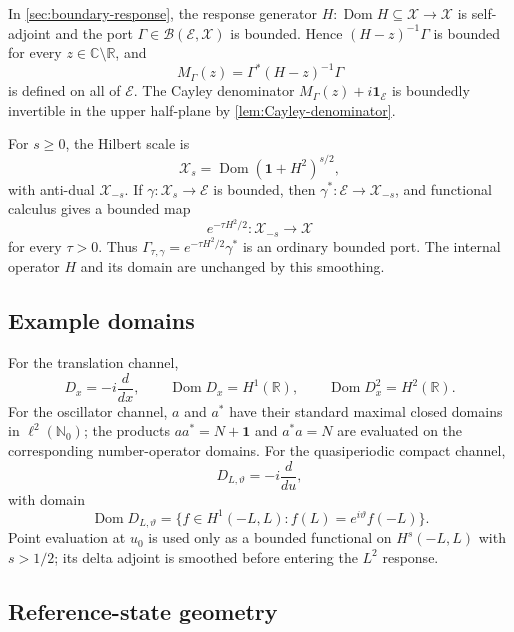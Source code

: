 \documentclass[11pt,reqno]{scrartcl}
\newcommand{\CC}{\mathbb C}
\newcommand{\RR}{\mathbb R}
\newcommand{\NN}{\mathbb N}
\DeclareMathOperator{\Dom}{Dom}
\newcommand{\scrX}{\mathscr X}
\newcommand{\scrE}{\mathscr E}
\theoremstyle{plain}
\theoremstyle{definition}
\theoremstyle{remark}
\begin{document}
In \cref{sec:boundary-response}, the response generator
\(H:\Dom H\subseteq\scrX\to\scrX\) is self-adjoint and the port
\(\Gamma\in\mathcal B(\scrE,\scrX)\) is bounded.  Hence
\((H-z)^{-1}\Gamma\) is bounded for every \(z\in\CC\setminus\RR\), and
\begin{equation}
  M_\Gamma(z)=\Gamma^*(H-z)^{-1}\Gamma
\end{equation}
is defined on all of \(\scrE\).  The Cayley denominator
\(M_\Gamma(z)+i\mathbf1_{\scrE}\) is boundedly invertible in the upper
half-plane by \cref{lem:Cayley-denominator}.

For \(s\ge0\), the Hilbert scale is
\begin{equation}
  \scrX_s=\Dom(\mathbf1+H^2)^{s/2},
\end{equation}
with anti-dual \(\scrX_{-s}\).  If
\(\gamma:\scrX_s\to\scrE\) is bounded, then
\(\gamma^*:\scrE\to\scrX_{-s}\), and functional calculus gives a bounded map
\begin{equation}
  e^{-\tau H^2/2}:\scrX_{-s}\longrightarrow\scrX
\end{equation}
for every \(\tau>0\).  Thus
\(\Gamma_{\tau,\gamma}=e^{-\tau H^2/2}\gamma^*\) is an ordinary bounded
port.  The internal operator \(H\) and its domain are unchanged by this
smoothing.

\subsection{Example domains}

For the translation channel,
\begin{equation}
  D_x=-i\frac{d}{dx},
  \qquad
  \Dom D_x=H^1(\RR),
  \qquad
  \Dom D_x^2=H^2(\RR).
\end{equation}
For the oscillator channel, \(a\) and \(a^*\) have their standard maximal
closed domains in \(\ell^2(\NN_0)\); the products \(aa^*=N+\mathbf1\) and
\(a^*a=N\) are evaluated on the corresponding number-operator domains.
For the quasiperiodic compact channel,
\begin{equation}
  D_{L,\vartheta}=-i\frac{d}{du},
\end{equation}
with domain
\begin{equation}
  \Dom D_{L,\vartheta}
  =\{f\in H^1(-L,L):f(L)=e^{i\vartheta}f(-L)\}.
\end{equation}
Point evaluation at \(u_0\) is used only as a bounded functional on
\(H^s(-L,L)\) with \(s>1/2\); its delta adjoint is smoothed before entering
the \(L^2\) response.

\subsection{Reference-state geometry}
\end{document}
